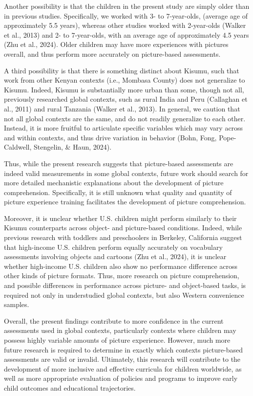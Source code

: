 \documentclass[10pt, letterpaper]{article}
\begin{document}
Another possibility is that the children in the present study are simply
older than in previous studies. Specifically, we worked with 3- to
7-year-olds, (average age of approximately 5.5 years), whereas other
studies worked with 2-year-olds (Walker et al., 2013) and 2- to
7-year-olds, with an average age of approximately 4.5 years (Zhu et al.,
2024). Older children may have more experiences with pictures overall,
and thus perform more accurately on picture-based assessments.

A third possibility is that there is something distinct about Kisumu,
such that work from other Kenyan contexts (i.e., Mombasa County) does
not generalize to Kisumu. Indeed, Kisumu is substantially more urban
than some, though not all, previously researched global contexts, such
as rural India and Peru (Callaghan et al., 2011) and rural Tanzania
(Walker et al., 2013). In general, we caution that not all global
contexts are the same, and do not readily generalize to each other.
Instead, it is more fruitful to articulate specific variables which may
vary across and within contexts, and thus drive variation in behavior
(Bohn, Fong, Pope-Caldwell, Stengelin, \& Haun, 2024).

Thus, while the present research suggests that picture-based assessments
are indeed valid measurements in some global contexts, future work
should search for more detailed mechanistic explanations about the
development of picture comprehension. Specifically, it is still unknown
what quality and quantity of picture experience training facilitates the
development of picture comprehension.

Moreover, it is unclear whether U.S. children might perform similarly to
their Kisumu counterparts across object- and picture-based conditions.
Indeed, while previous research with toddlers and preschoolers in
Berkeley, California suggest that high-income U.S. children perform
equally accurately on vocabulary assessments involving objects and
cartoons (Zhu et al., 2024), it is unclear whether high-income U.S.
children also show no performance difference across other kinds of
picture formats. Thus, more research on picture comprehension, and
possible differences in performance across picture- and object-based
tasks, is required not only in understudied global contexts, but also
Western convenience samples.

Overall, the present findings contribute to more confidence in the
current assessments used in global contexts, particularly contexts where
children may possess highly variable amounts of picture experience.
However, much more future research is required to determine in exactly
which contexts picture-based assessments are valid or invalid.
Ultimately, this research will contribute to the development of more
inclusive and effective curricula for children worldwide, as well as
more appropriate evaluation of policies and programs to improve early
child outcomes and educational trajectories.
\end{document}
